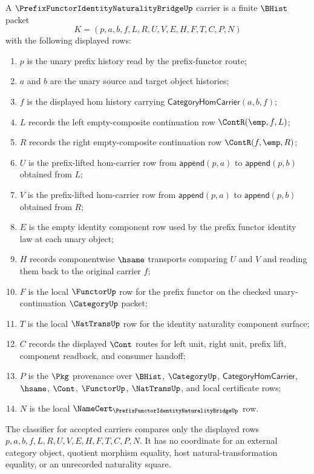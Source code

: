 \begin{definition}
\label{def:prefix-functor-identity-naturality-bridge-carrier}
A $\PrefixFunctorIdentityNaturalityBridgeUp$ carrier is a finite $\BHist$ packet
$$
K=(p,a,b,f,L,R,U,V,E,H,F,T,C,P,N)
$$
with the following displayed rows:
\begin{enumerate}
\item $p$ is the unary prefix history read by the prefix-functor route;
\item $a$ and $b$ are the unary source and target object histories;
\item $f$ is the displayed hom history carrying $\mathsf{CategoryHomCarrier}(a,b,f)$;
\item $L$ records the left empty-composite continuation row $\ContR(\emp,f,L)$;
\item $R$ records the right empty-composite continuation row $\ContR(f,\emp,R)$;
\item $U$ is the prefix-lifted hom-carrier row from $\mathsf{append}(p,a)$ to $\mathsf{append}(p,b)$ obtained from $L$;
\item $V$ is the prefix-lifted hom-carrier row from $\mathsf{append}(p,a)$ to $\mathsf{append}(p,b)$ obtained from $R$;
\item $E$ is the empty identity component row used by the prefix functor identity law at each unary object;
\item $H$ records componentwise $\hsame$ transports comparing $U$ and $V$ and reading them back to the original carrier $f$;
\item $F$ is the local $\FunctorUp$ row for the prefix functor on the checked unary-continuation $\CategoryUp$ packet;
\item $T$ is the local $\NatTransUp$ row for the identity naturality component surface;
\item $C$ records the displayed $\Cont$ routes for left unit, right unit, prefix lift, component readback, and consumer handoff;
\item $P$ is the $\Pkg$ provenance over $\BHist$, $\CategoryUp$, $\mathsf{CategoryHomCarrier}$, $\hsame$, $\Cont$, $\FunctorUp$, $\NatTransUp$, and local certificate rows;
\item $N$ is the local $\NameCert_{\PrefixFunctorIdentityNaturalityBridgeUp}$ row.
\end{enumerate}
The classifier for accepted carriers compares only the displayed rows $p,a,b,f,L,R,U,V,E,H,F,T,C,P,N$. It has no coordinate for an external category object, quotient morphism equality, host natural-transformation equality, or an unrecorded naturality square.
\end{definition}

